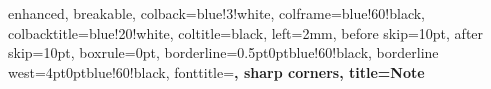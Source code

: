 \usepackage{tcolorbox}

 {
  enhanced,
  breakable,
  colback=blue!3!white,      
  colframe=blue!60!black,    
  colbacktitle=blue!20!white, 
  coltitle=black,            
  left=2mm,
  before skip=10pt,
  after skip=10pt,
  boxrule=0pt,
  borderline={0.5pt}{0pt}{blue!60!black},
  borderline west={4pt}{0pt}{blue!60!black},
  fonttitle=\bfseries,
  sharp corners,
  title={\textbf{Note}}
}